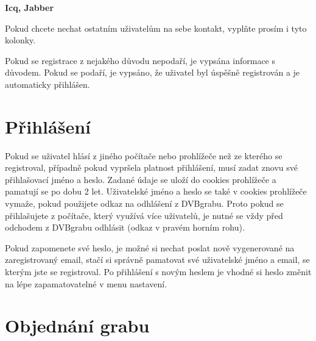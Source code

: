 \vspace{10pt}

\textbf{Icq, Jabber}

Pokud chcete nechat ostatním uživatelům na sebe kontakt, vyplňte prosím i tyto kolonky.

\vspace{10pt}

Pokud se registrace z nejakého důvodu nepodaří, je vypsána informace s důvodem. Pokud se podaří, je vypsáno, že uživatel byl úspěšně registrován a je automaticky přihlášen.

\vspace{10pt}

\section{Přihlášení}

\vspace{10pt}

Pokud se uživatel hlásí z jiného počítače nebo prohlížeče než ze kterého se registroval, případně pokud vypršela platnost přihlášení, musí zadat znovu své přihlašovací jméno a heslo. Zadané údaje se uloží do cookies prohlížeče a pamatují se po dobu 2 let. Uživatelské jméno a heslo se také v cookies prohlížeče vymaže, pokud použijete odkaz na odhlášení z DVBgrabu. Proto pokud se přihlašujete z počítače, který využívá více uživatelů, je nutné se vždy před odchodem z DVBgrabu odhlásit (odkaz v pravém horním rohu).

\vspace{10pt}

Pokud zapomenete své heslo, je možné si nechat poslat nově vygenerované na zaregistrovaný email, stačí si správně pamatovat své uživatelské jméno a email, se kterým jste se registroval. Po přihlášení s novým heslem je vhodné si heslo změnit na lépe zapamatovatelné v menu nastavení.

\vspace{10pt}

\section{Objednání grabu}

\vspace{10pt}

